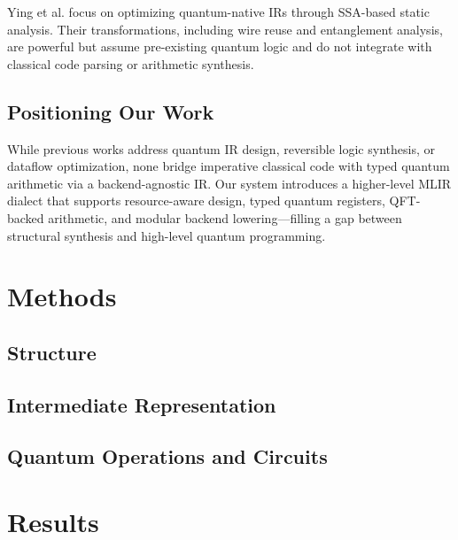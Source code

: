 \documentclass[conference]{IEEEtran}
\begin{document}
Ying et al. focus on optimizing quantum-native IRs through SSA-based static analysis. Their transformations, including wire reuse and entanglement analysis, are powerful but assume pre-existing quantum logic and do not integrate with classical code parsing or arithmetic synthesis.

\subsection{Positioning Our Work}

While previous works address quantum IR design, reversible logic synthesis, or dataflow optimization, none bridge imperative classical code with typed quantum arithmetic via a backend-agnostic IR. Our system introduces a higher-level MLIR dialect that supports resource-aware design, typed quantum registers, QFT-backed arithmetic, and modular backend lowering—filling a gap between structural synthesis and high-level quantum programming.


\section{Methods}

\subsection{Structure}

\subsection{Intermediate Representation}

\subsection{Quantum Operations and Circuits}


\section{Results}
\end{document}

